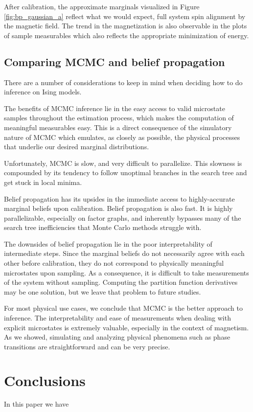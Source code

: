 \documentclass{article}
\begin{document}
After calibration, the approximate marginals visualized in Figure
\ref{fig:bp_gaussian_a} reflect what we would expect, full system spin alignment 
by the magnetic field. 
The trend in the magnetization is also observable in the plots of sample 
measurables which also reflects the appropriate minimization of energy. 

\subsection{Comparing MCMC and belief propagation}

There are a number of considerations to keep in mind when deciding how to do 
inference on Ising models. 

The benefits of MCMC inference lie in the easy access to valid microstate 
samples throughout the estimation process, which makes the computation of 
meaningful measurables easy. 
This is a direct consequence of the simulatory nature of MCMC which emulates, as 
closely as possible, the physical processes that underlie our desired marginal 
distributions. 

Unfortunately, MCMC is slow, and very difficult to parallelize. 
This slowness is compounded by its tendency to follow unoptimal branches in the 
search tree and get stuck in local minima. 

Belief propagation has its upsides in the immediate access to highly-accurate 
marginal beliefs upon calibration. 
Belief propagation is also fast. 
It is highly parallelizable, especially on factor graphs, and inherently 
bypasses many of the search tree inefficiencies that Monte Carlo methods 
struggle with. 

The downsides of belief propagation lie in the poor interpretability of 
intermediate steps. 
Since the marginal beliefs do not necessarily agree with each other before 
calibration, they do not correspond to physically meaningful microstates upon 
sampling. 
As a consequence, it is difficult to take measurements of the system without 
sampling. 
Computing the partition function derivatives may be one solution, but we leave 
that problem to future studies. 

For most physical use cases, we conclude that MCMC is the better approach to 
inference. 
The interpretability and ease of measurements when dealing with explicit 
microstates is extremely valuable, especially in the context of magnetism. 
As we showed, simulating and analyzing physical phenomena such as phase 
transitions are straightforward and can be very precise. 

\section{Conclusions}

In this paper we have 

\newpage

\end{document}
